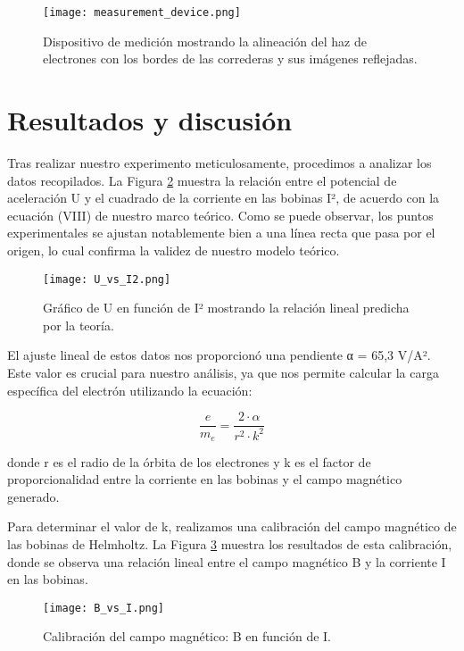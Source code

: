 \documentclass[twocolumn,a4paper,11pt]{scrartcl}
\begin{document}
\begin{figure}[h]
    \centering
    \texttt{[image: measurement\_device.png]}
    \caption{Dispositivo de medición mostrando la alineación del haz de electrones con los bordes de las correderas y sus imágenes reflejadas.}
    \label{fig:measurement_device}
\end{figure}

\section{Resultados y discusión}

Tras realizar nuestro experimento meticulosamente, procedimos a analizar los datos recopilados. La Figura \ref{fig:U_vs_I2} muestra la relación entre el potencial de aceleración U y el cuadrado de la corriente en las bobinas I², de acuerdo con la ecuación (VIII) de nuestro marco teórico. Como se puede observar, los puntos experimentales se ajustan notablemente bien a una línea recta que pasa por el origen, lo cual confirma la validez de nuestro modelo teórico.

\begin{figure}[h]
    \centering
    \texttt{[image: U\_vs\_I2.png]}
    \caption{Gráfico de U en función de I² mostrando la relación lineal predicha por la teoría.}
    \label{fig:U_vs_I2}
\end{figure}

El ajuste lineal de estos datos nos proporcionó una pendiente α = 65,3 V/A². Este valor es crucial para nuestro análisis, ya que nos permite calcular la carga específica del electrón utilizando la ecuación:

\begin{equation}
\frac{e}{m_e} = \frac{2 \cdot \alpha}{r^2 \cdot k^2}
\end{equation}

donde r es el radio de la órbita de los electrones y k es el factor de proporcionalidad entre la corriente en las bobinas y el campo magnético generado.

Para determinar el valor de k, realizamos una calibración del campo magnético de las bobinas de Helmholtz. La Figura \ref{fig:B_vs_I} muestra los resultados de esta calibración, donde se observa una relación lineal entre el campo magnético B y la corriente I en las bobinas.

\begin{figure}[h]
    \centering
    \texttt{[image: B\_vs\_I.png]}
    \caption{Calibración del campo magnético: B en función de I.}
    \label{fig:B_vs_I}
\end{figure}
\end{document}
